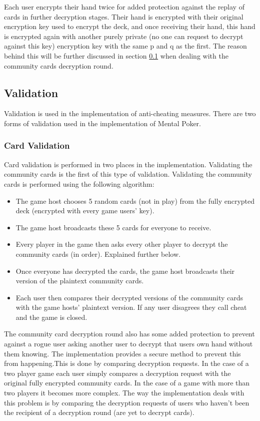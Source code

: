 \documentclass[11pt, oneside]{article}   	%
\begin{document}
Each user encrypts their hand twice for added protection against the replay of cards in further decryption stages. Their hand is encrypted with their original encryption key used to encrypt the deck, and once receiving their hand, this hand is encrypted again with another purely private (no one can request to decrypt against this key) encryption key with the same p and q as the first. The reason behind this will be further discussed in section \ref{sec:validation} when dealing with the community cards decryption round.

\subsection{Validation}
\label{sec:validation}

Validation is used in the implementation of anti-cheating measures. There are two forms of validation used in the implementation of Mental Poker.

\subsubsection{Card Validation}

Card validation is performed in two places in the implementation. Validating the community cards is the first of this type of validation. Validating the community cards is performed using the following algorithm:

\begin{itemize}
\renewcommand{\labelitemi}{$\bullet$}
\item The game host chooses 5 random cards (not in play) from the fully encrypted deck (encrypted with every game users’ key).
\item The game host broadcasts these 5 cards for everyone to receive.
\item Every player in the game then asks every other player to decrypt the community cards (in order). Explained further below.
\item Once everyone has decrypted the cards, the game host broadcasts their version of the plaintext community cards.
\item Each user then compares their decrypted versions of the community cards with the game hosts’ plaintext version. If any user disagrees they call cheat and the game is closed.
\end{itemize}

The community card decryption round also has some added protection to prevent against a rogue user asking another user to decrypt that users own hand without them knowing. The implementation provides a secure method to prevent this from happening.This is done by comparing decryption requests. In the case of a two player game each user simply compares a decryption request with the original fully encrypted community cards. In the case of a game with more than two players it becomes more complex. The way the implementation deals with this problem is by comparing the decryption requests of users who haven't been the recipient of a decryption round (are yet to decrypt cards).\\
\end{document}
